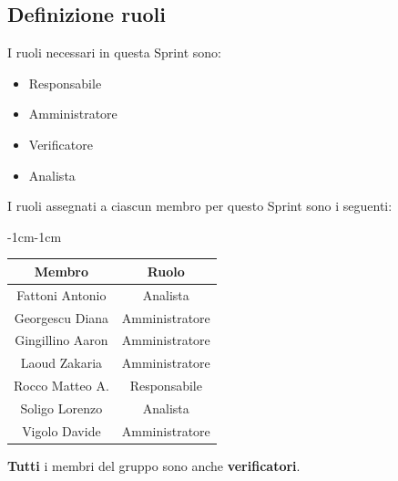 \documentclass[a4paper,12pt]{article}
\begin{document}
\subsection{Definizione ruoli}
I ruoli necessari in questa Sprint sono:
\begin{itemize}[noitemsep]
    \item Responsabile
    \item Amministratore
    \item Verificatore
    \item Analista
\end{itemize}

\noindent I ruoli assegnati a ciascun membro per questo Sprint sono i seguenti:
\begin{table}[H]
    \begin{adjustwidth}{-1cm}{-1cm}
    \centering
\begin{tabular}{|c|c|}
    \hline
    \textbf{Membro} & \textbf{Ruolo} \\
    \hline
    Fattoni Antonio & Analista \\
    \hline
    Georgescu Diana & Amministratore \\
    \hline
    Gingillino Aaron & Amministratore \\
    \hline
    Laoud Zakaria & Amministratore \\
    \hline
    Rocco Matteo A. & Responsabile \\
    \hline
    Soligo Lorenzo & Analista \\
    \hline
    Vigolo Davide & Amministratore \\
    \hline
\end{tabular}
    \end{adjustwidth}
\end{table}
\textbf{Tutti} i membri del gruppo sono anche \textbf{verificatori}.
\end{document}
